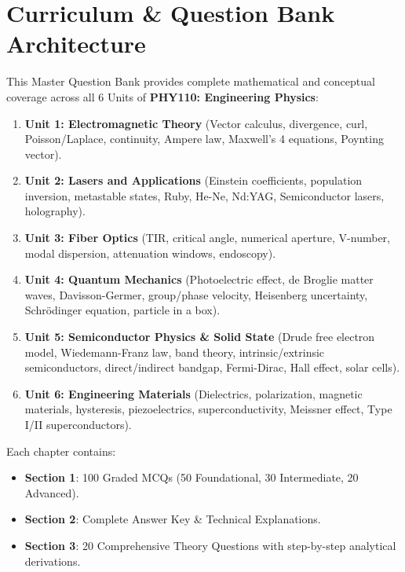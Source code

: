 \chapter*{Curriculum \& Question Bank Architecture}

This Master Question Bank provides complete mathematical and conceptual coverage across all 6 Units of \textbf{PHY110: Engineering Physics}:
\begin{enumerate}
    \item \textbf{Unit 1: Electromagnetic Theory} (Vector calculus, divergence, curl, Poisson/Laplace, continuity, Ampere law, Maxwell's 4 equations, Poynting vector).
    \item \textbf{Unit 2: Lasers and Applications} (Einstein coefficients, population inversion, metastable states, Ruby, He-Ne, Nd:YAG, Semiconductor lasers, holography).
    \item \textbf{Unit 3: Fiber Optics} (TIR, critical angle, numerical aperture, V-number, modal dispersion, attenuation windows, endoscopy).
    \item \textbf{Unit 4: Quantum Mechanics} (Photoelectric effect, de Broglie matter waves, Davisson-Germer, group/phase velocity, Heisenberg uncertainty, Schrödinger equation, particle in a box).
    \item \textbf{Unit 5: Semiconductor Physics \& Solid State} (Drude free electron model, Wiedemann-Franz law, band theory, intrinsic/extrinsic semiconductors, direct/indirect bandgap, Fermi-Dirac, Hall effect, solar cells).
    \item \textbf{Unit 6: Engineering Materials} (Dielectrics, polarization, magnetic materials, hysteresis, piezoelectrics, superconductivity, Meissner effect, Type I/II superconductors).
\end{enumerate}

Each chapter contains:
\begin{itemize}
    \item \textbf{Section 1}: 100 Graded MCQs (50 Foundational, 30 Intermediate, 20 Advanced).
    \item \textbf{Section 2}: Complete Answer Key \& Technical Explanations.
    \item \textbf{Section 3}: 20 Comprehensive Theory Questions with step-by-step analytical derivations.
\end{itemize}
\newpage
